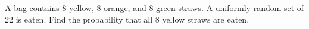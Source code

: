 A bag contains 8 yellow, 8 orange, and 8 green straws. A uniformly random set of 22 is eaten. Find the probability that all 8 yellow straws are eaten.
